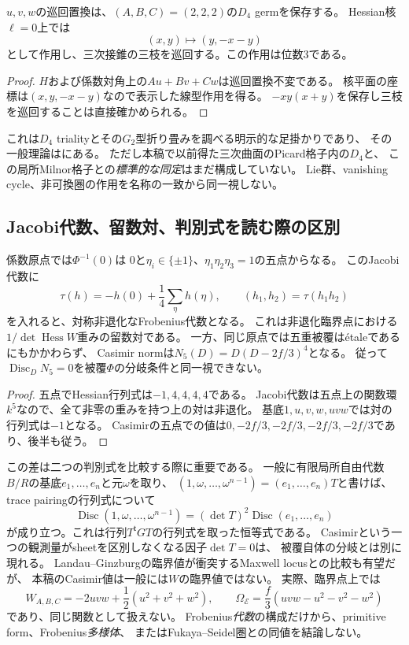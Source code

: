 \begin{corollary}[trialityの具体的な入口]
\label{cor:gradient-local-triality}
$u,v,w$の巡回置換は、$(A,B,C)=(2,2,2)$の$D_4$ germを保存する。
Hessian核$\ell=0$上では
\[
 (x,y)\longmapsto(y,-x-y)
\]
として作用し、三次接錐の三枝を巡回する。この作用は位数3である。
\end{corollary}
\begin{proof}
$H$および係数対角上の$Au+Bv+Cw$は巡回置換不変である。
核平面の座標は$(x,y,-x-y)$なので表示した線型作用を得る。
$-xy(x+y)$を保存し三枝を巡回することは直接確かめられる。
\end{proof}
これは$D_4$ trialityとその$G_2$型折り畳みを調べる明示的な足掛かりであり、
その一般理論は\cite{MikoszWeberTriality}にある。
ただし本稿で以前得た三次曲面のPicard格子内の$D_4$と、
この局所Milnor格子との\emph{標準的な同定}はまだ構成していない。
Lie群、vanishing cycle、非可換圏の作用を名称の一致から同一視しない。

\subsection{Jacobi代数、留数対、判別式を読む際の区別}
\begin{proposition}[原点のFrobenius代数と非分岐な値の衝突]
\label{prop:jacobi-residue-maxwell}
係数原点では$\Phi^{-1}(0)$は
$0$と$\eta_i\in\{\pm1\}$、$\eta_1\eta_2\eta_3=1$の五点からなる。
このJacobi代数に
\[
 \tau(h)=-h(0)+\frac14\sum_\eta h(\eta),\qquad
 (h_1,h_2)=\tau(h_1h_2)
\]
を入れると、対称非退化なFrobenius代数となる。
これは非退化臨界点における$1/\det\operatorname{Hess}W$重みの留数対である。
一方、同じ原点では五重被覆は\'{e}taleであるにもかかわらず、
Casimir normは$N_5(D)=D(D-2f/3)^4$となる。
従って$\operatorname{Disc}_D N_5=0$を被覆$\Phi$の分岐条件と同一視できない。
\end{proposition}
\begin{proof}
五点でHessian行列式は$-1,4,4,4,4$である。
Jacobi代数は五点上の関数環$k^5$なので、全て非零の重みを持つ上の対は非退化。
基底$1,u,v,w,uvw$では対の行列式は$-1$となる。
Casimirの五点での値は$0,-2f/3,-2f/3,-2f/3,-2f/3$であり、後半も従う。
\end{proof}

この差は二つの判別式を比較する際に重要である。
一般に有限局所自由代数$B/R$の基底$e_1,\ldots,e_n$と元$\omega$を取り、
$(1,\omega,\ldots,\omega^{n-1})=(e_1,\ldots,e_n)T$と書けば、
trace pairingの行列式について
\[
 \operatorname{Disc}(1,\omega,\ldots,\omega^{n-1})
     =(\det T)^2\operatorname{Disc}(e_1,\ldots,e_n)
\]
が成り立つ。これは行列$T^{\mathsf t}GT$の行列式を取った恒等式である。
Casimirという一つの観測量がsheetを区別しなくなる因子$\det T=0$は、
被覆自体の分岐とは別に現れる。
Landau--Ginzburgの臨界値が衝突するMaxwell locusとの比較も有望だが、
本稿のCasimir値は一般には$W$の臨界値ではない。
実際、臨界点上では
\[
 W_{A,B,C}=-2uvw+\frac12(u^2+v^2+w^2),\qquad
 \Omega_{\mathcal E}=\frac f3(uvw-u^2-v^2-w^2)
\]
であり、同じ関数として扱えない。
Frobenius\emph{代数}の構成だけから、primitive form、Frobenius\emph{多様体}、
またはFukaya--Seidel圏との同値を結論しない。

